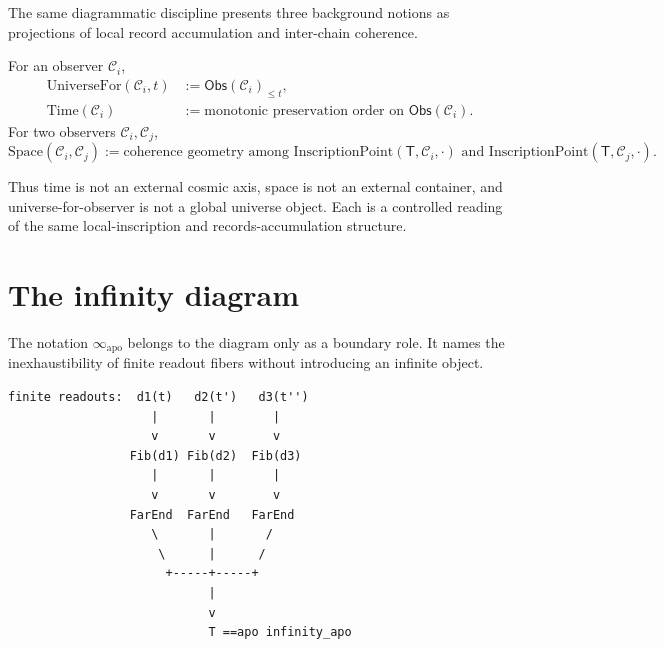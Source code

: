 The same diagrammatic discipline presents three background notions as
projections of local record accumulation and inter-chain coherence.

\begin{definition}
\label{def:far-end-projection-diagram}
For an observer $\mathcal{C}_i$,
$$
\begin{aligned}
\mathrm{UniverseFor}(\mathcal{C}_i,t)
&:=
\mathsf{Obs}(\mathcal{C}_i)_{\leq t},\\
\mathrm{Time}(\mathcal{C}_i)
&:=
\text{monotonic preservation order on }\mathsf{Obs}(\mathcal{C}_i).
\end{aligned}
$$
For two observers $\mathcal{C}_i,\mathcal{C}_j$,
$$
\mathrm{Space}(\mathcal{C}_i,\mathcal{C}_j)
:=
\text{coherence geometry among }
\mathrm{InscriptionPoint}(\mathsf{T},\mathcal{C}_i,\cdot)
\text{ and }
\mathrm{InscriptionPoint}(\mathsf{T},\mathcal{C}_j,\cdot).
$$
\end{definition}

Thus time is not an external cosmic axis, space is not an external container,
and universe-for-observer is not a global universe object. Each is a controlled
reading of the same local-inscription and records-accumulation structure.

\section{The infinity diagram}
\label{sec:far-end-diagrammatics-infinity}

The notation $\infty_{\mathrm{apo}}$ belongs to the diagram only as a boundary
role. It names the inexhaustibility of finite readout fibers without
introducing an infinite object.

\begin{center}
\begin{minipage}{0.92\textwidth}
\begin{verbatim}
finite readouts:  d1(t)   d2(t')   d3(t'')
                    |       |        |
                    v       v        v
                 Fib(d1) Fib(d2)  Fib(d3)
                    |       |        |
                    v       v        v
                 FarEnd  FarEnd   FarEnd
                    \       |       /
                     \      |      /
                      +-----+-----+
                            |
                            v
                            T ==apo infinity_apo
\end{verbatim}
\end{minipage}
\end{center}

